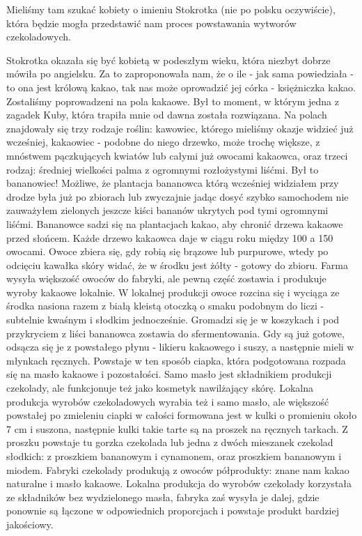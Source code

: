 Mieliśmy tam szukać kobiety o imieniu Stokrotka (nie po polsku oczywiście), która będzie mogła przedstawić nam proces powstawania wytworów czekoladowych.
\par Stokrotka okazała się być kobietą w podeszłym wieku, która niezbyt dobrze mówiła po angielsku. 
Za to zaproponowała nam, że o ile - jak sama powiedziała - to ona jest królową kakao, tak nas może oprowadzić jej córka - księżniczka kakao.
Zostaliśmy poprowadzeni na pola kakaowe.
Był to moment, w którym jedna z zagadek Kuby, która trapiła mnie od dawna została rozwiązana.
Na polach znajdowały się trzy rodzaje roślin: kawowiec, którego mieliśmy okazje widzieć już wcześniej, kakaowiec - podobne do niego drzewko, może trochę większe, z mnóstwem pączkujących kwiatów lub całymi już owocami kakaowca, oraz trzeci rodzaj: średniej wielkości palma z ogromnymi rozłożystymi liśćmi.
Był to bananowiec!
Możliwe, że plantacja bananowca którą wcześniej widziałem przy drodze była już po zbiorach lub zwyczajnie jadąc dosyć szybko samochodem nie zauważyłem zielonych jeszcze kiści bananów ukrytych pod tymi ogromnymi liśćmi.
Bananowce sadzi się na plantacjach kakao, aby chronić drzewa kakaowe przed słońcem.
Każde drzewo kakaowca daje w ciągu roku między 100 a 150 owocami.
Owoce zbiera się, gdy robią się brązowe lub purpurowe, wtedy po odcięciu kawałka skóry widać, że w środku jest żółty - gotowy do zbioru.
Farma wysyła większość owoców do fabryki, ale pewną część zostawia i produkuje wyroby kakaowe lokalnie.
W lokalnej produkcji owoce rozcina się i wyciąga ze środka nasiona razem z białą kleistą otoczką o smaku podobnym do liczi - subtelnie kwaśnym i słodkim jednocześnie.
Gromadzi się je w koszykach i pod przykryciem z liści bananowca zostawia do sfermentowania.
Gdy są już gotowe, odsącza się je z powstałego płynu - likieru kakaowego i suszy, a następnie mieli w młynkach ręcznych.
Powstaje w ten sposób ciapka, która podgotowana rozpada się na masło kakaowe i pozostałości.
Samo masło jest składnikiem produkcji czekolady, ale funkcjonuje też jako kosmetyk nawilżający skórę.
Lokalna produkcja wyrobów czekoladowych wyrabia też i samo masło, ale większość powstałej po zmieleniu ciapki w całości formowana jest w kulki o promieniu około 7 cm i suszona, następnie kulki takie tarte są na proszek na ręcznych tarkach.
Z proszku powstaje tu gorzka czekolada lub jedna z dwóch mieszanek czekolad słodkich: z proszkiem bananowym i cynamonem, oraz proszkiem bananowym i miodem.
Fabryki czekolady produkują z owoców półprodukty: znane nam kakao naturalne i masło kakaowe.
Lokalna produkcja do wyrobów czekolady korzystała ze składników bez wydzielonego masła, fabryka zaś wysyła je dalej, gdzie ponownie są łączone w odpowiednich proporcjach i powstaje produkt bardziej jakościowy.
